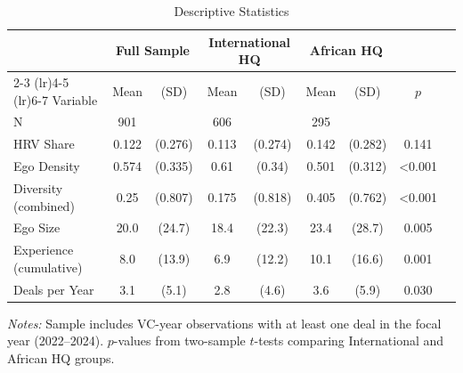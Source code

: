 
\begin{table}[htbp]
\centering
\caption{Descriptive Statistics}
\label{tab:descriptives}
\small
\begin{tabular}{lcccccccc}
\toprule
 & \multicolumn{2}{c}{Full Sample} & \multicolumn{2}{c}{International HQ} & \multicolumn{2}{c}{African HQ} & \\
\cmidrule(lr){2-3} \cmidrule(lr){4-5} \cmidrule(lr){6-7}
Variable & Mean & (SD) & Mean & (SD) & Mean & (SD) & $p$ \\
\midrule
N & 901 & & 606 & & 295 & & \\
HRV Share & 0.122 & (0.276) & 0.113 & (0.274) & 0.142 & (0.282) & 0.141 \\
Ego Density & 0.574 & (0.335) & 0.61 & (0.34) & 0.501 & (0.312) & <0.001 \\
Diversity (combined) & 0.25 & (0.807) & 0.175 & (0.818) & 0.405 & (0.762) & <0.001 \\
Ego Size & 20.0 & (24.7) & 18.4 & (22.3) & 23.4 & (28.7) & 0.005 \\
Experience (cumulative) & 8.0 & (13.9) & 6.9 & (12.2) & 10.1 & (16.6) & 0.001 \\
Deals per Year & 3.1 & (5.1) & 2.8 & (4.6) & 3.6 & (5.9) & 0.030 \\

\bottomrule
\end{tabular}
\begin{tablenotes}
\small
\item \textit{Notes:} Sample includes VC-year observations with at least one deal in the focal year (2022--2024).
$p$-values from two-sample $t$-tests comparing International and African HQ groups.
\end{tablenotes}
\end{table}
